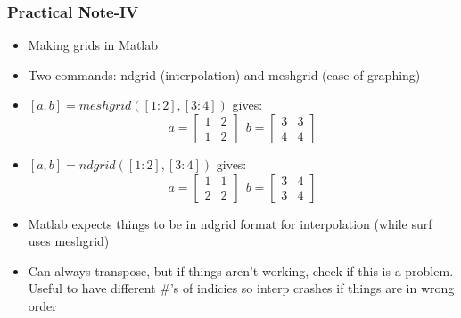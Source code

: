 \documentclass{beamer}
\begin{document}
\begin{frame}
\frametitle[alignment=center]{Practical Note-IV}
\begin{itemize}
\item Making grids in Matlab
\bigskip
\item Two commands: ndgrid (interpolation) and meshgrid (ease of graphing)
\item $[a,b]=meshgrid([1:2],[3:4])$ gives:
$$a=\left[\begin{array}{cc}1 & 2 \\ 1 & 2\end{array}\right]\ \ b=\left[\begin{array}{cc}3 & 3 \\ 4 & 4\end{array}\right]$$
\item $[a,b]=ndgrid([1:2],[3:4])$ gives:
$$a=\left[\begin{array}{cc}1 & 1 \\ 2 & 2\end{array}\right]\ \ b=\left[\begin{array}{cc}3 & 4 \\ 3 & 4\end{array}\right]$$
\item Matlab expects things to be in ndgrid format for interpolation (while surf uses meshgrid)
\bigskip
\item Can always transpose, but if things aren't working, check if this is a problem.  Useful to have different \#'s of indicies so interp crashes if things are in wrong order
\end{itemize}
\end{frame}
\end{document}
